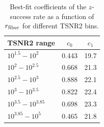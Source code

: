 \begin{table} 
    \caption{Best-fit coefficients of the $z$-success rate as a function of
    $r_{\rm fiber}$ for different TSNR2 bins.} 
    \begin{center}
        \begin{tabular}{lcc} \toprule
            TSNR2 range & $c_0$ & $c_1$ \\[3pt]
            \hline 
            $10^{1.5}   - 10^{2}$       & 0.443 & 19.7 \\ 
            $10^{2}     - 10^{2.5}$       & 0.668 & 21.3 \\ 
            $10^{2.5}   - 10^{3}$       & 0.888 & 22.1 \\ 
            $10^{3}     - 10^{3.5}$       & 0.822 & 22.4 \\ 
            $10^{3.5}   - 10^{3.85}$    & 0.698 & 23.3 \\ 
            $10^{3.85}  - 10^{5}$      & 0.465 & 21.8 \\ 
            \hline            
\end{tabular} \label{tab:zfail}
\end{center}
\end{table}

